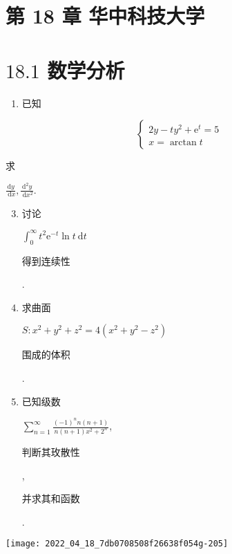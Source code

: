 \documentclass[10pt]{article}
\begin{document}
\section{第 18 章 华中科技大学}
\section{$18.1$ 数学分析}
\begin{enumerate}
  \item \begin{CJK}{UTF8}{mj}已知\end{CJK}
\end{enumerate}
$$
\left\{\begin{array}{l}
2 y-t y^{2}+\mathrm{e}^{t}=5 \\
x=\arctan t
\end{array}\right.
$$
\begin{CJK}{UTF8}{mj}求\end{CJK} $\frac{\mathrm{d} y}{\mathrm{~d} x}, \frac{\mathrm{d}^{2} y}{\mathrm{~d} x^{2}}$.

\begin{enumerate}
  \setcounter{enumi}{2}
  \item \begin{CJK}{UTF8}{mj}讨论\end{CJK} $\int_{0}^{\infty} t^{2} \mathrm{e}^{-t} \ln t \mathrm{~d} t$ \begin{CJK}{UTF8}{mj}得到连续性\end{CJK}.

  \item \begin{CJK}{UTF8}{mj}求曲面\end{CJK} $S: x^{2}+y^{2}+z^{2}=4\left(x^{2}+y^{2}-z^{2}\right)$ \begin{CJK}{UTF8}{mj}围成的体积\end{CJK}.

  \item \begin{CJK}{UTF8}{mj}已知级数\end{CJK} $\sum_{n=1}^{\infty} \frac{(-1)^{n} n(n+1)}{n(n+1) x^{2}+2^{n}}$, \begin{CJK}{UTF8}{mj}判断其玫散性\end{CJK}, \begin{CJK}{UTF8}{mj}并求其和函数\end{CJK}.

\end{enumerate}
\texttt{[image: 2022\_04\_18\_7db0708508f26638f054g-205]}
\end{document}
